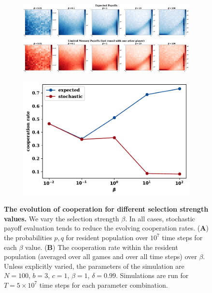 \documentclass[11pt]{article}
\theoremstyle{plainCl1}
\theoremstyle{plainCl2}
\begin{document}
\begin{figure}[!htbp]
  \centering
  \begin{subfigure}{.65\textwidth}
    \centering
    \includegraphics[width=.8\textwidth]{static/expected_for_selection_strenght.pdf}
    \includegraphics[width=.8\textwidth]{static/stochastic_for_selection_strenght.pdf}
  \end{subfigure}%
  \begin{subfigure}{.35\textwidth}
    \vspace{.3cm}
    \includegraphics[width=.8\textwidth]{static/cooperation_rate_over_betas.pdf}
  \end{subfigure}
\caption{{\bf The evolution of cooperation for different selection strength values.}
We vary the selection strength $\beta$. In all cases, stochastic payoff
evaluation tends to reduce the evolving cooperation rates. ({\bf A}) the
probabilities \(p, q\) for resident population over \(10^7\) time steps for each
\(\beta\) value. ({\bf B}) The cooperation rate within the resident population
(averaged over all games and over all time steps) over \(\beta\).
Unless explicitly varied, the parameters of the simulation are $N\!=\!100$,
$b\!=\!3$, $c\!=\!1$, $\beta\!=\!1$, $\delta\!=\!0.99$. Simulations are run for
$T\!=\!5\times 10^7$ time steps for each parameter
combination.}\label{fig:cooperation_rate_over_betas}
\end{figure}
\end{document}
